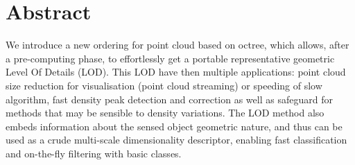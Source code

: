  
\section{Abstract}
	We introduce a new ordering for point cloud based on octree, which allows, after a pre-computing phase, 
	to effortlessly get a portable representative geometric Level Of Details (LOD).
	This LOD have then multiple applications: point cloud size reduction for 
	visualisation (point cloud streaming) or speeding of slow algorithm,
	 fast density peak detection and correction as well as safeguard for methods that may be sensible to density variations.
	The LOD method also embeds information about the sensed object geometric nature, 
	and thus can be used as a crude multi-scale dimensionality descriptor, 
	enabling fast classification and on-the-fly filtering with basic classes. 
	 
	